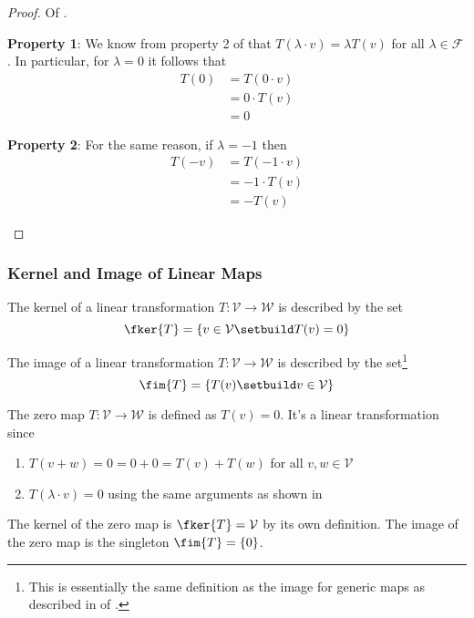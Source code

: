 \begin{proof}
	Of .
	\begin{flushleft}
		\textbf{Property 1}: We know from property 2 of
		 that $T(\lambda\cdot v)=\lambda T(v)$
		for all $\lambda\in\mathcal{F}$. In particular, for $\lambda=0$ it follows
		that
		\begin{align*}
			T(0) & = T(0\cdot v)  \\
			     & = 0 \cdot T(v) \\
			     & = 0
		\end{align*}
	\end{flushleft}
	\begin{flushleft}
		\textbf{Property 2}: For the same reason, if $\lambda=-1$ then
		\begin{align*}
			T(-v) & = T(-1\cdot v)  \\
			      & = -1 \cdot T(v) \\
			      & = -T(v)
		\end{align*}
	\end{flushleft}
\end{proof}

\subsubsection{Kernel and Image of Linear Maps}\label{subsubsec-ker-im-linear-maps}

\begin{definition}\label{def-kernel-linear-map}
	The kernel of a linear transformation $T:\mathcal{V}\to\mathcal{W}$ is
	described by the set
	\begin{equation}
		\fker{T}=\left\{v\in\mathcal{V}\setbuild T(v)=0\right\}
	\end{equation}
\end{definition}

\begin{definition}\label{def-image-linear-map}
	The image of a linear transformation $T:\mathcal{V}\to\mathcal{W}$ is
	described by the set\footnote{This is essentially the same definition as the
		image for generic maps as described in  of
		.}
	\begin{equation}
		\fim{T}=\left\{T(v)\setbuild v\in\mathcal{V}\right\}
	\end{equation}
\end{definition}

\begin{exm}\label{exm-zero-map}
	The zero map $T:\mathcal{V}\to\mathcal{W}$ is defined as $T(v)=0$. It's a
	linear transformation since
	\begin{enumerate}
		\item $T(v+w)=0=0+0=T(v)+T(w)$ for all $v,w\in\mathcal{V}$
		\item $T(\lambda\cdot v)=0$ using the same arguments as shown in
	\end{enumerate}
	The kernel of the zero map is $\fker{T}=\mathcal{V}$ by its own definition.
	The image of the zero map is the singleton $\fim{T}=\{0\}$.
\end{exm}

